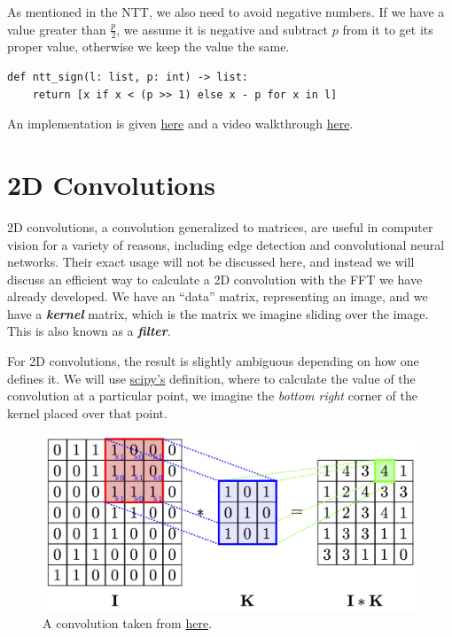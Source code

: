 \documentclass[11pt, oneside]{article}
\newcommand{\emphasis}[1]{\textbf{\textit{#1}}}
\theoremstyle{plain}
\theoremstyle{definition}
\begin{document}
As mentioned in the NTT, we also need to avoid negative numbers. If we have a
value greater than \( \frac{p}{2} \), we assume it is negative and subtract
\( p \) from it to get its proper value, otherwise we keep the value the same.
\begin{verbatim}
def ntt_sign(l: list, p: int) -> list:
    return [x if x < (p >> 1) else x - p for x in l]
\end{verbatim}

An implementation is given
\href{https://github.com/stephen-huan/anime-music-quiz}{here} and a video
walkthrough \href{https://www.youtube.com/watch?v=7fUicc_lIGA}{here}.

\newpage

\section{2D Convolutions}
2D convolutions, a convolution generalized to matrices, are useful in computer
vision for a variety of reasons, including edge detection and convolutional
neural networks. Their exact usage will not be discussed here, and instead
we will discuss an efficient way to calculate a 2D convolution with the FFT we 
have already developed. We have an \enquote{data} matrix, representing an image,
and we have a \emphasis{kernel} matrix, which is the matrix we imagine
sliding over the image. This is also known as a \emphasis{filter}.

For 2D convolutions, the result is slightly ambiguous depending on how one
defines it. We will use
\href{https://docs.scipy.org/doc/scipy/reference/generated/scipy.signal.convolve2d.html}{scipy's}
definition, where to calculate the value of the convolution at a particular
point, we imagine the \textit{bottom right} corner of the kernel
placed over that point.

\begin{figure}[h!]
  \centering
  \includegraphics[scale=1.4]{conv.png}
  \caption{A convolution taken from \href{https://petar-v.com/GAT/}{here}.}
\end{figure}
\end{document}
